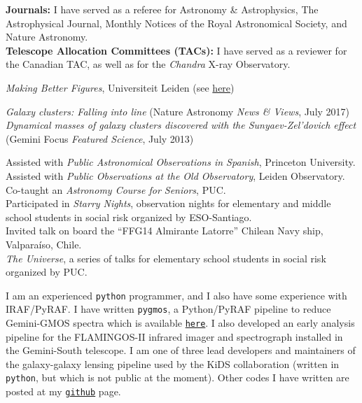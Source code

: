 \documentclass[11pt]{article}
\begin{document}

\noindent 
\textbf{Journals:} I have served as a referee for Astronomy \& Astrophysics, The Astrophysical Journal, Monthly Notices of the Royal 
    Astronomical Society, and Nature Astronomy.\\
\noindent
\textbf{Telescope Allocation Committees (TACs):} I have served as a reviewer for the Canadian TAC, as well as for the
    \textit{Chandra} X-ray Observatory.


\noindent
{} \emph{Making Better Figures}, Universiteit Leiden
(see \href{https://home.strw.leidenuniv.nl/~kenworthy/teaching/better_figures/}{here})


\noindent
\emph{Galaxy clusters: Falling into line} (Nature Astronomy \emph{News \& Views}, July 2017)\\
\emph{Dynamical masses of galaxy clusters discovered with the Sunyaev-Zel'dovich effect} (Gemini Focus \emph{Featured Science}, July 2013)


\noindent
{} Assisted with \emph{Public Astronomical Observations in Spanish}, Princeton University.\\
 Assisted with \emph{Public Observations at the Old Observatory}, Leiden Observatory.\\
 Co-taught an \emph{Astronomy Course for Seniors}, PUC.\\
 Participated in \emph{Starry Nights}, observation nights for elementary and middle school students in social risk organized by ESO-Santiago.\\
 Invited talk on board the ``FFG14 Almirante Latorre'' Chilean Navy ship, Valpara\'iso, Chile.\\
 \emph{The Universe}, a series of talks for elementary school students in social risk organized by PUC.\\



I am an experienced \texttt{python} programmer, and I also have some experience with IRAF/PyRAF. I have written {\tt pygmos}, a Python/PyRAF pipeline to reduce Gemini-GMOS spectra which is available \href{https://github.com/cristobal-sifon/pygmos/}{\texttt{here}}. I also developed an early analysis pipeline for the FLAMINGOS-II infrared imager and spectrograph installed in the Gemini-South telescope. I am one of three lead developers and maintainers of the galaxy-galaxy lensing pipeline used by the KiDS collaboration (written in \texttt{python}, but which is not public at the moment). Other codes I have written are posted at my \href{https://github.com/cristobal-sifon}{\texttt{github}} page.\\
\end{document}
